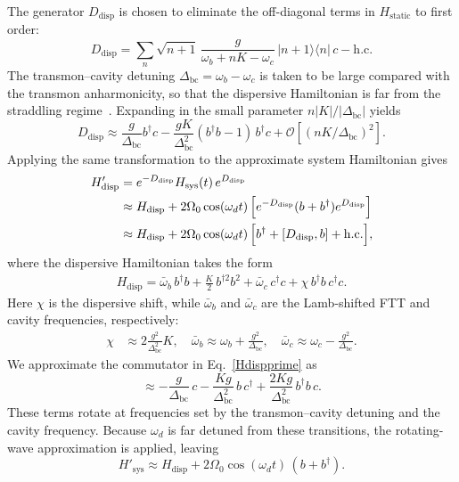 The generator \(D_{\text{disp}}\) is chosen to eliminate the off-diagonal terms in $H_\text{static}$ to first order:
\begin{equation}
\label{Ddisp}
    D_{\text{disp}} = \sum_n \sqrt{n+1}\,
    \frac{g}{\omega_b + nK - \omega_c}\,
    |n+1\rangle \langle n|\, c - \mathrm{h.c.}
\end{equation}
The transmon--cavity detuning \(\Delta_{\text{bc}}=\omega_b-\omega_c\) is taken to be large compared with the transmon anharmonicity, so that the dispersive Hamiltonian is far from the straddling regime~\cite{Koch2007}. Expanding in the small parameter \(n|K|/|\Delta_{\text{bc}}|\) yields
\begin{equation}
    D_{\text{disp}} \approx
    \frac{g}{\Delta_{\text{bc}}} b^\dagger c
    - \frac{gK}{\Delta_{\text{bc}}^2} (b^\dagger b - 1)\, b^\dagger c
    + \mathcal{O}\!\left[\left(nK/\Delta_{\text{bc}}\right)^2\right].
\end{equation}
Applying the same transformation to the approximate system Hamiltonian gives
\begin{align}
\label{Hdispprime}
    H'_{\text{disp}}
    &= e^{-D_{\text{disp}}} H_\text{sys}(t)\, e^{D_{\text{disp}}}
    \nonumber\\
    &\approx H_{\text{disp}}
    + 2\Omega_0 \cos(\omega_d t)\,
    \Bigl[e^{-D_{\text{disp}}} (b + b^\dagger) e^{D_{\text{disp}}}\Bigr]
    \nonumber \\
    &\approx H_{\text{disp}}
    + 2\Omega_0 \cos(\omega_d t)\,
    \Bigl[b^\dagger + [D_{\text{disp}}, b] + \mathrm{h.c.}\Bigr],
\end{align}
where the dispersive Hamiltonian takes the form
\begin{align}
\label{Hdisp}
H_\text{disp} =
\bar{\omega}_b\, b^\dagger b
+ \frac{K}{2}\, b^{\dagger 2} b^{2}
+ \bar{\omega}_c\, c^\dagger c
+ \chi\, b^\dagger b\, c^\dagger c.
\end{align}
Here \(\chi\) is the dispersive shift, while \(\bar{\omega}_b\) and \(\bar{\omega}_c\) are the Lamb-shifted FTT and cavity frequencies, respectively:
\begin{align}
\chi &\approx 2\frac{g^2}{\Delta_{\text{bc}}^2}K,\quad
\bar{\omega}_b \approx \omega_b + \frac{g^2}{\Delta_{\text{bc}}}, \quad
\bar{\omega}_c \approx \omega_c - \frac{g^2}{\Delta_{\text{bc}}}.
\end{align} 
We approximate the commutator in Eq.~\eqref{Hdispprime} as
\begin{equation}
[D_{\text{disp}}, b] \approx
-\frac{g}{\Delta_{\text{bc}}}\, c
-\frac{Kg}{\Delta_{\text{bc}}^2}\, b\, c^\dagger
+\frac{2Kg}{\Delta_{\text{bc}}^2}\, b^\dagger b\, c .
\end{equation}
These terms rotate at frequencies set by the transmon--cavity detuning and the cavity frequency. Because \(\omega_d\) is far detuned from these transitions, the rotating-wave approximation is applied, leaving
\begin{equation}
H'_{\text{sys}} \approx H_{\text{disp}} + 2\Omega_0 \cos(\omega_d t)\,(b + b^\dagger).
\end{equation}


